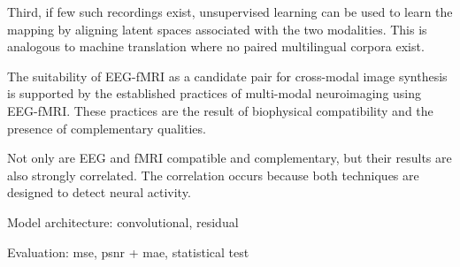 \documentclass{article}
\begin{document}
Third, if few such recordings exist, unsupervised learning can be used to learn the mapping by aligning latent spaces associated with the two modalities. This is analogous to machine translation where no paired multilingual corpora exist.

The suitability of EEG-fMRI as a candidate pair for cross-modal image synthesis is supported by the established practices of multi-modal neuroimaging using EEG-fMRI. These practices are the result of biophysical compatibility and the presence of complementary qualities. 

Not only are EEG and fMRI compatible and complementary, but their results are also strongly correlated. The correlation occurs because both techniques are designed to detect neural activity.

Model architecture: convolutional, residual

Evaluation: mse, psnr + mae, statistical test
\end{document}
